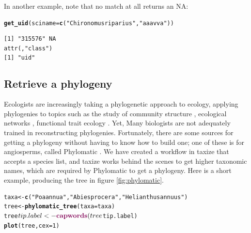 \documentclass[10pt]{article}\usepackage[]{graphicx}\usepackage[]{color}
\makeatletter
\newcommand{\hlfunctioncall}[1]{\textcolor[rgb]{0.501960784313725,0,0.329411764705882}{\textbf{#1}}}%
\newcommand{\hlstring}[1]{\textcolor[rgb]{0.6,0.6,1}{#1}}%
\newenvironment{kframe}{%
 \def\at@end@of@kframe{}%
 \ifinner\ifhmode%
  \def\at@end@of@kframe{\end{minipage}}%
  \begin{minipage}{\columnwidth}%
 \fi\fi%
 \def\FrameCommand##1{\hskip\@totalleftmargin \hskip-\fboxsep
 \colorbox{shadecolor}{##1}\hskip-\fboxsep
     \hskip-\linewidth \hskip-\@totalleftmargin \hskip\columnwidth}%
 \MakeFramed {\advance\hsize-\width
   \@totalleftmargin\z@ \linewidth\hsize
   \@setminipage}}%
 {\par\unskip\endMakeFramed%
 \at@end@of@kframe}
\newenvironment{knitrout}{}{} %
\makeatother
\begin{document}
In another example, note that no match at all returns an NA:

\begin{knitrout}
\color{fgcolor}\begin{kframe}
\begin{alltt}
\hlfunctioncall{get_uid}(sciname = \hlfunctioncall{c}(\hlstring{"Chironomus riparius"}, \hlstring{"aaa vva"}))
\end{alltt}
\begin{verbatim}
[1] "315576" NA      
attr(,"class")
[1] "uid"
\end{verbatim}
\end{kframe}
\end{knitrout}


\subsection*{Retrieve a phylogeny}
Ecologists are increasingly taking a phylogenetic approach to ecology, applying phylogenies to topics such as the study of community structure \cite{webb2002phylogenies}, ecological networks \cite{rafferty2013phylogenetic}, functional trait ecology \cite{poff2006functional}. Yet, Many biologists are not adequately trained in reconstructing phylogenies. Fortunately, there are some sources for getting a phylogeny without having to know how to build one; one of these is for angiosperms, called Phylomatic \cite{webb2005}. We have created a workflow in taxize that accepts a species list, and taxize works behind the scenes to get higher taxonomic names, which are required by Phylomatic to get a phylogeny. Here is a short example, producing the tree in figure \ref{fig:phylomatic}.

\begin{knitrout}
\color{fgcolor}\begin{kframe}
\begin{alltt}
taxa <- \hlfunctioncall{c}(\hlstring{"Poa annua"}, \hlstring{"Abies procera"}, \hlstring{"Helianthus annuus"})
tree <- \hlfunctioncall{phylomatic_tree}(taxa = taxa)
tree$tip.label <- \hlfunctioncall{capwords}(tree$tip.label)
\hlfunctioncall{plot}(tree, cex = 1)
\end{alltt}
\end{kframe}
\end{knitrout}
\end{document}
